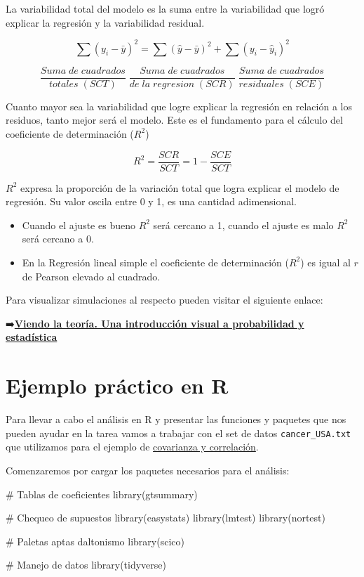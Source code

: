 \documentclass[
  spanish,
  a4paper,
]{scrbook}
\newenvironment{Shaded}{\begin{snugshade}}{\end{snugshade}}
\newcommand{\CommentTok}[1]{\textcolor[rgb]{0.37,0.37,0.37}{#1}}
\newcommand{\FunctionTok}[1]{\textcolor[rgb]{0.28,0.35,0.67}{#1}}
\newcommand{\NormalTok}[1]{\textcolor[rgb]{0.00,0.23,0.31}{#1}}
\begin{document}
La variabilidad total del modelo es la suma entre la variabilidad que
logró explicar la regresión y la variabilidad residual.

\[
\sum (y_i-\bar{y})^2 = \sum (\hat{y}-\bar{y})^2 + \sum (y_i -\hat{y}_i)^2 
\]

\[
\frac{Suma \; de \; cuadrados}{totales \; (SCT)} \; \frac{Suma \; de \; cuadrados}{de \; la \; regresion \; (SCR)} \; \frac{Suma \; de \; cuadrados}{residuales \; (SCE)}
\]

Cuanto mayor sea la variabilidad que logre explicar la regresión en
relación a los residuos, tanto mejor será el modelo. Este es el
fundamento para el cálculo del coeficiente de determinación (\(R^2\))

\[
R^2 = \frac{SCR}{SCT} = 1 - \frac{SCE}{SCT}
\]

\(R^2\) expresa la proporción de la variación total que logra explicar
el modelo de regresión. Su valor oscila entre 0 y 1, es una cantidad
adimensional.

\begin{itemize}
\item
  Cuando el ajuste es bueno \(R^2\) será cercano a 1, cuando el ajuste
  es malo \(R^2\) será cercano a 0.
\item
  En la Regresión lineal simple el coeficiente de determinación
  (\(R^2\)) es igual al \(r\) de Pearson elevado al cuadrado.
\end{itemize}

Para visualizar simulaciones al respecto pueden visitar el siguiente
enlace:

➡️\href{https://seeing-theory.brown.edu/regression-analysis/es.html\#section1}{\textbf{Viendo
la teoría. Una introducción visual a probabilidad y estadística}}

\section{Ejemplo práctico en R}\label{ejemplo-pruxe1ctico-en-r-5}

Para llevar a cabo el análisis en R y presentar las funciones y paquetes
que nos pueden ayudar en la tarea vamos a trabajar con el set de datos
\texttt{cancer\_USA.txt} que utilizamos para el ejemplo de
\hyperref[covarianza-y-correlaciuxf3n]{covarianza y correlación}.

Comenzaremos por cargar los paquetes necesarios para el análisis:

\begin{Shaded}
\begin{Highlighting}[]
\CommentTok{\# Tablas de coeficientes}
\FunctionTok{library}\NormalTok{(gtsummary)}

\CommentTok{\# Chequeo de supuestos}
\FunctionTok{library}\NormalTok{(easystats)}
\FunctionTok{library}\NormalTok{(lmtest)}
\FunctionTok{library}\NormalTok{(nortest)}

\CommentTok{\# Paletas aptas daltonismo}
\FunctionTok{library}\NormalTok{(scico)}

\CommentTok{\# Manejo de datos}
\FunctionTok{library}\NormalTok{(tidyverse)}
\end{Highlighting}
\end{Shaded}
\end{document}

